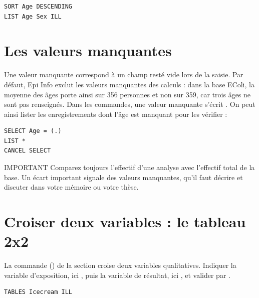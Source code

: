 \begin{tcolorbox}
	\begin{lstlisting}[language=EPIscript, style=mystyle, caption={Tri des enregistrements selon l'âge}, label=lst:sort]
SORT Age DESCENDING
LIST Age Sex ILL
	\end{lstlisting}
\end{tcolorbox}

\section{Les valeurs manquantes}

Une valeur manquante correspond à un champ resté vide lors de la saisie. Par défaut, Epi Info exclut les valeurs manquantes des calculs : dans la base EColi, la moyenne des âges porte ainsi sur 356 personnes et non sur 359, car trois âges ne sont pas renseignés. Dans les commandes, une valeur manquante s'écrit . On peut ainsi lister les enregistrements dont l'âge est manquant pour les vérifier :

\begin{tcolorbox}
	\begin{lstlisting}[language=EPIscript, style=mystyle, caption={Repérer les valeurs manquantes}, label=lst:missing]
SELECT Age = (.)
LIST *
CANCEL SELECT
	\end{lstlisting}
\end{tcolorbox}

\begin{mybox}[colbacktitle=IMPORTANT]{\faExclamationCircle{} IMPORTANT}
Comparez toujours l'effectif d'une analyse avec l'effectif total de la base. Un écart important signale des valeurs manquantes, qu'il faut décrire et discuter dans votre mémoire ou votre thèse.
\end{mybox}

\section{Croiser deux variables : le tableau 2x2}

La commande  () de la section  croise deux variables qualitatives. Indiquer la variable d'exposition, ici , puis la variable de résultat, ici , et valider par .

\begin{tcolorbox}
	\begin{lstlisting}[language=EPIscript, style=mystyle, caption={Tableau 2x2 entre la crème glacée et la maladie}, label=lst:tables]
TABLES Icecream ILL
	\end{lstlisting}
\end{tcolorbox}

